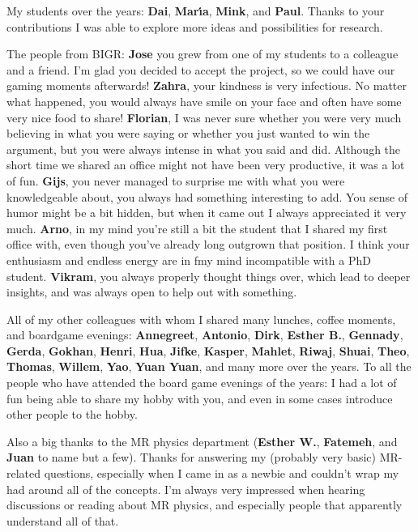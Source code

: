 My students over the years: \textbf{Dai}, \textbf{Mar{\'\i}a}, \textbf{Mink}, and \textbf{Paul}.
Thanks to your contributions I was able to explore more ideas and possibilities for research.

The people from BIGR:
\textbf{Jose} you grew from one of my students to a colleague and a friend.
I'm glad you decided to accept the project, so we could have our gaming moments afterwards!
\textbf{Zahra}, your kindness is very infectious.
No matter what happened, you would always have smile on your face and often have some very nice food to share!
\textbf{Florian}, I was never sure whether you were very much believing in what you were saying or whether you just wanted to win the argument, but you were always intense in what you said and did.
Although the short time we shared an office might not have been very productive, it was a lot of fun.
\textbf{Gijs}, you never managed to surprise me with what you were knowledgeable about, you always had something interesting to add.
You sense of humor might be a bit hidden, but when it came out I always appreciated it very much.
\textbf{Arno}, in my mind you're still a bit the student that I shared my first office with, even though you've already long outgrown that position.
I think your enthusiasm and endless energy are in fmy mind incompatible with a PhD student.
\textbf{Vikram}, you always properly thought things over, which lead to deeper insights, and was always open to help out with something.

All of my other colleagues with whom I shared many lunches, coffee moments, and boardgame evenings:
\textbf{Annegreet}, \textbf{Antonio}, \textbf{Dirk}, \textbf{Esther B.}, \textbf{Gennady}, \textbf{Gerda}, \textbf{Gokhan}, \textbf{Henri}, \textbf{Hua}, \textbf{Jifke}, \textbf{Kasper}, \textbf{Mahlet}, \textbf{Riwaj}, \textbf{Shuai}, \textbf{Theo}, \textbf{Thomas}, \textbf{Willem}, \textbf{Yao}, \textbf{Yuan Yuan}, and many more over the years.
To all the people who have attended the board game evenings of the years: I had a lot of fun being able to share my hobby with you, and even in some cases introduce other people to the hobby.

Also a big thanks to the MR physics department (\textbf{Esther W.}, \textbf{Fatemeh}, and \textbf{Juan} to name but a few).
Thanks for answering my (probably very basic) MR-related questions, especially when I came in as a newbie and couldn't wrap my had around all of the concepts.
I'm always very impressed when hearing discussions or reading about MR physics, and especially people that apparently understand all of that.

